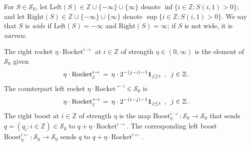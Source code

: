 \documentclass[letterpaper,11pt,oneside,reqno]{amsbook}
\newcommand{\Z}{\ensuremath{\mathbb{Z}}}
\numberwithin{figure}{chapter}
\theoremstyle{definition}
\theoremstyle{definition}
\theoremstyle{definition}
\theoremstyle{definition}
\theoremstyle{definition}
\newcommand{\mc}{\mathcal}
\newcommand{\tis}{\mc{S}_0}
\newcommand{\rocket}{\textrm{Rocket}}
\newcommand{\boost}{\textrm{Boost}}
\newcommand{\lef}{\textrm{Left}}
\newcommand{\righ}{\textrm{Right}}
\def\hfff#1{\label{#1}}
\begin{document}
For $S \in \tis$, let $\lef(S) \in \Z \cup \{ -\infty\} \cup \{\infty\}$ denote $\inf \{ i \in \Z : S(i,1) > 0 \}$; and let $\righ(S) \in \Z \cup \{ -\infty\} \cup \{\infty\}$ denote $\sup \{ i \in \Z : S(i,1) > 0 \}$.
We say that $S$ is {\em wide}\hfff{wide} if $\lef(S) = -\infty$ and $\righ(S) = \infty$; if $S$ is not wide, it is {\em narrow}. 

The right rocket $\eta \cdot \rocket^{i\rightarrow}$ at $i \in \Z$ of strength $\eta \in (0,\infty)$ is the element of $\tis$ given 
$$
 \eta \cdot \rocket^{i\rightarrow}_j \, = \, \eta \cdot 2^{-(j-i)-1} {\bf 1}_{j \geq i} \, \, \, , \, \, \, j \in \Z \, .
$$
The counterpart left rocket  $\eta \cdot \rocket^{\leftarrow i} \in \tis$ is 
$$
 \eta \cdot \rocket^{\leftarrow i}_j \, = \, \eta \cdot 2^{-(i-j)-1} {\bf 1}_{j \leq i} \, \, \, , \, \, \, j \in \Z \, .
$$
The right boost at $i \in \Z$ of strength $\eta$ is the map $\boost_\eta^{i\rightarrow}:\tis \to \tis$ that sends $q = (q_i: i \in \Z) \in \tis$
to $q +  \eta \cdot \rocket^{i\rightarrow}$. The corresponding left boost  $\boost_\eta^{i\leftarrow}:\tis \to \tis$ sends $q$
to $q +  \eta \cdot \rocket^{i\leftarrow}$.
\end{document}
